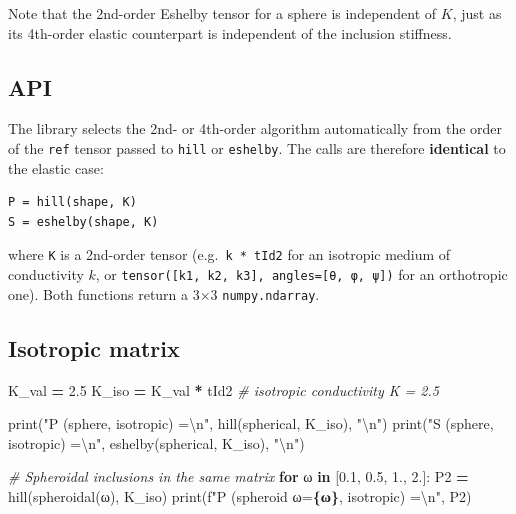 \documentclass[
  a4paper,
  numbers=noendperiod,
  DIV=12]{scrreprt}
\newenvironment{Shaded}{\begin{snugshade}}{\end{snugshade}}
\newcommand{\BuiltInTok}[1]{#1}
\newcommand{\CharTok}[1]{\textcolor[rgb]{0.31,0.60,0.02}{#1}}
\newcommand{\CommentTok}[1]{\textcolor[rgb]{0.56,0.35,0.01}{\textit{#1}}}
\newcommand{\ControlFlowTok}[1]{\textcolor[rgb]{0.13,0.29,0.53}{\textbf{#1}}}
\newcommand{\FloatTok}[1]{\textcolor[rgb]{0.00,0.00,0.81}{#1}}
\newcommand{\KeywordTok}[1]{\textcolor[rgb]{0.13,0.29,0.53}{\textbf{#1}}}
\newcommand{\NormalTok}[1]{#1}
\newcommand{\OperatorTok}[1]{\textcolor[rgb]{0.81,0.36,0.00}{\textbf{#1}}}
\newcommand{\SpecialCharTok}[1]{\textcolor[rgb]{0.81,0.36,0.00}{\textbf{#1}}}
\newcommand{\SpecialStringTok}[1]{\textcolor[rgb]{0.31,0.60,0.02}{#1}}
\newcommand{\StringTok}[1]{\textcolor[rgb]{0.31,0.60,0.02}{#1}}
\begin{document}
Note that the 2nd-order Eshelby tensor for a sphere is independent of
\(K\), just as its 4th-order elastic counterpart is independent of the
inclusion stiffness.

\subsection{API}\label{api}

The library selects the 2nd- or 4th-order algorithm automatically from
the order of the \texttt{ref} tensor passed to \texttt{hill} or
\texttt{eshelby}. The calls are therefore \textbf{identical} to the
elastic case:

\begin{verbatim}
P = hill(shape, K)
S = eshelby(shape, K)
\end{verbatim}

where \texttt{K} is a 2nd-order tensor (e.g.~\texttt{k\ *\ tId2} for an
isotropic medium of conductivity \(k\), or
\texttt{tensor({[}k1,\ k2,\ k3{]},\ angles={[}θ,\ φ,\ ψ{]})} for an
orthotropic one). Both functions return a 3×3 \texttt{numpy.ndarray}.

\subsection{Isotropic matrix}\label{isotropic-matrix}

\begin{Shaded}
\begin{Highlighting}[]
\NormalTok{K\_val }\OperatorTok{=} \FloatTok{2.5}
\NormalTok{K\_iso }\OperatorTok{=}\NormalTok{ K\_val }\OperatorTok{*}\NormalTok{ tId2     }\CommentTok{\# isotropic conductivity  K = 2.5}

\BuiltInTok{print}\NormalTok{(}\StringTok{"P (sphere, isotropic) =}\CharTok{\textbackslash{}n}\StringTok{"}\NormalTok{, hill(spherical, K\_iso), }\StringTok{"}\CharTok{\textbackslash{}n}\StringTok{"}\NormalTok{)}
\BuiltInTok{print}\NormalTok{(}\StringTok{"S (sphere, isotropic) =}\CharTok{\textbackslash{}n}\StringTok{"}\NormalTok{, eshelby(spherical, K\_iso), }\StringTok{"}\CharTok{\textbackslash{}n}\StringTok{"}\NormalTok{)}

\CommentTok{\# Spheroidal inclusions in the same matrix}
\ControlFlowTok{for}\NormalTok{ ω }\KeywordTok{in}\NormalTok{ [}\FloatTok{0.1}\NormalTok{, }\FloatTok{0.5}\NormalTok{, }\FloatTok{1.}\NormalTok{, }\FloatTok{2.}\NormalTok{]:}
\NormalTok{    P2 }\OperatorTok{=}\NormalTok{ hill(spheroidal(ω), K\_iso)}
    \BuiltInTok{print}\NormalTok{(}\SpecialStringTok{f"P (spheroid ω=}\SpecialCharTok{\{ω\}}\SpecialStringTok{, isotropic) =}\CharTok{\textbackslash{}n}\SpecialStringTok{"}\NormalTok{, P2)}
\end{Highlighting}
\end{Shaded}
\end{document}
